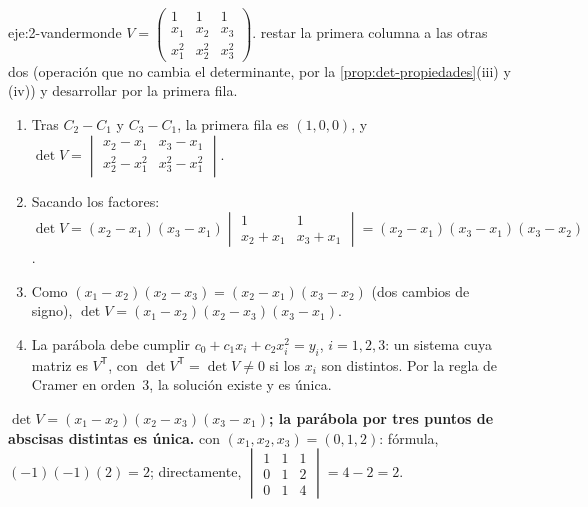 \begin{solucion}{eje:2-vandermonde}
\datos $V=\begin{pmatrix}1&1&1\\x_1&x_2&x_3\\x_1^2&x_2^2&x_3^2\end{pmatrix}$.
\planteamiento restar la primera columna a las otras dos (operación que no cambia el determinante, por la \cref{prop:det-propiedades}(iii) y (iv)) y desarrollar por la primera fila.
\pasos
\begin{enumerate}[label=\arabic*.]
  \item Tras $C_2-C_1$ y $C_3-C_1$, la primera fila es $(1,0,0)$, y $\det V=\begin{vmatrix}x_2-x_1&x_3-x_1\\x_2^2-x_1^2&x_3^2-x_1^2\end{vmatrix}$.
  \item Sacando los factores: $\det V=(x_2-x_1)(x_3-x_1)\begin{vmatrix}1&1\\x_2+x_1&x_3+x_1\end{vmatrix}=(x_2-x_1)(x_3-x_1)(x_3-x_2)$.
  \item Como $(x_1-x_2)(x_2-x_3)=(x_2-x_1)(x_3-x_2)$ (dos cambios de signo), $\det V=(x_1-x_2)(x_2-x_3)(x_3-x_1)$.
  \item La parábola debe cumplir $c_0+c_1x_i+c_2x_i^2=y_i$, $i=1,2,3$: un sistema cuya matriz es $V^{\mathsf T}$, con $\det V^{\mathsf T}=\det V\neq0$ si los $x_i$ son distintos. Por la regla de Cramer en orden~3, la solución existe y es única.
\end{enumerate}
\resultado \textbf{$\det V=(x_1-x_2)(x_2-x_3)(x_3-x_1)$; la parábola por tres puntos de abscisas distintas es única.}
\comprobacion con $(x_1,x_2,x_3)=(0,1,2)$: fórmula, $(-1)(-1)(2)=2$; directamente, $\begin{vmatrix}1&1&1\\0&1&2\\0&1&4\end{vmatrix}=4-2=2$.
\end{solucion}

